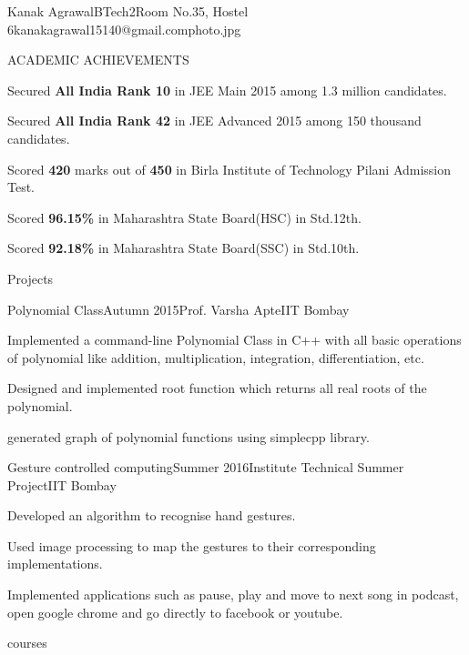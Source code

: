 \documentclass{resume_ssl}
\begin{document}
\begin{Header}{Kanak Agrawal}{BTech}{2}{Room No.35, Hostel 6}{kanakagrawal15140@gmail.com}{photo.jpg}
\end{Header}
\begin{section}{ACADEMIC ACHIEVEMENTS}
	\begin{subsection}{}{}{}{}
		\item Secured \textbf{All India Rank 10} in JEE Main 2015 among 1.3 million candidates.
		\item Secured \textbf{All India Rank 42} in JEE Advanced 2015 among 150 thousand candidates.
		\item Scored \textbf{420} marks out of \textbf{450} in Birla Institute of Technology Pilani Admission Test.
		\item Scored \textbf{96.15\%} in Maharashtra State Board(HSC) in Std.12th.
		\item Scored \textbf{92.18\%} in Maharashtra State Board(SSC) in Std.10th.
	\end{subsection}
\end{section}
\begin{section}{Projects}
	\begin{subsection}{Polynomial Class}{Autumn 2015}{Prof. Varsha Apte}{IIT Bombay}
		\item Implemented a command-line Polynomial Class in C++ with all basic operations of polynomial like addition, multiplication, integration, differentiation, etc.
		\item Designed and implemented root function which returns all real roots of the polynomial.
		\item generated graph of polynomial functions using simplecpp library.
	\end{subsection}
	\begin{subsection}{Gesture controlled computing}{Summer 2016}{Institute Technical Summer Project}{IIT Bombay}
		\item Developed an algorithm to recognise hand gestures.
		\item Used image processing to map the gestures to their corresponding implementations.
		\item Implemented applications such as pause, play and move to next song in podcast, open google chrome and go directly to facebook or youtube.
	\end{subsection}
\end{section}
\begin{section}{courses}
	\begin{Course}
	\end{Course}
\end{section}
\end{document}
